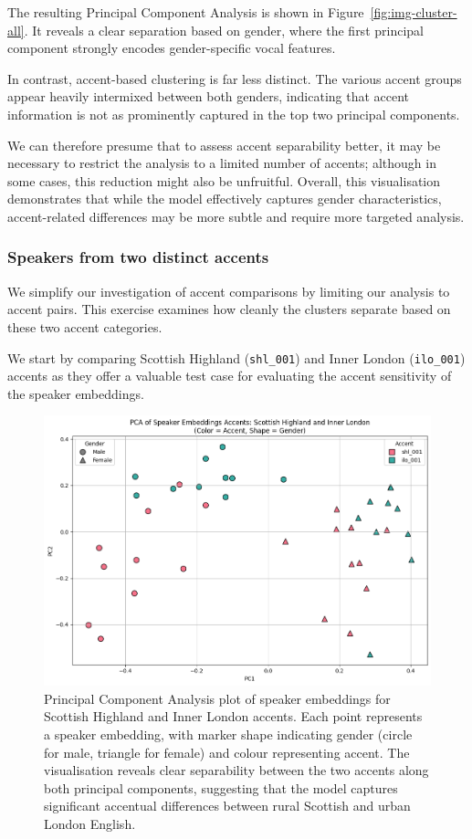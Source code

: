 \documentclass[conference]{IEEEtran}
\begin{document}
	The resulting Principal Component Analysis is shown in Figure~\ref{fig:img-cluster-all}. It reveals a clear separation based on gender, where the first principal component strongly encodes gender-specific vocal features. 
	
	In contrast, accent-based clustering is far less distinct. The various accent groups appear heavily intermixed between both genders, indicating that accent information is not as prominently captured in the top two principal components. 
	
	We can therefore presume that to assess accent separability better, it may be necessary to restrict the analysis to a limited number of accents; although in some cases, this reduction might also be unfruitful. Overall, this visualisation demonstrates that while the model effectively captures gender characteristics, accent-related differences may be more subtle and require more targeted analysis.
	
	
	\subsubsection{Speakers from two distinct accents}
	
	We simplify our investigation of accent comparisons by limiting our analysis to accent pairs. This exercise examines how cleanly the clusters separate based on these two accent categories.
	
	We start by comparing  Scottish Highland (\texttt{shl\_001}) and Inner London (\texttt{ilo\_001}) accents as they offer a valuable test case for evaluating the accent sensitivity of the speaker embeddings. 
	
	\begin{figure}[H]
		\centering
		\includegraphics[width=0.7\linewidth]{img/img-cluster-shl-ilo}
		\caption{Principal Component Analysis plot of speaker embeddings for Scottish Highland and Inner London accents. Each point represents a speaker embedding, with marker shape indicating gender (circle for male, triangle for female) and colour representing accent. The visualisation reveals clear separability between the two accents along both principal components, suggesting that the model captures significant accentual differences between rural Scottish and urban London English.}
		\label{fig:img-cluster-shl-ilo}
	\end{figure}
	
\end{document}
